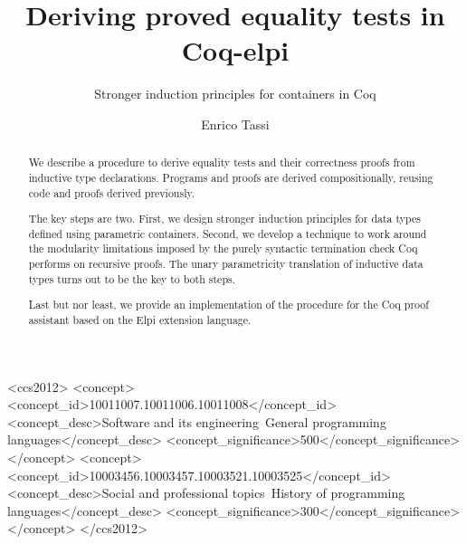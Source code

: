 \documentclass[sigplan,10pt,review]{acmart}\settopmatter{printfolios=true,printccs=false,printacmref=false}
\begin{document}
\title{Deriving proved equality tests in Coq-elpi}
\subtitle{Stronger induction principles for containers in Coq}

\author{Enrico Tassi}



\begin{abstract}
We describe a procedure to derive equality tests and their correctness
proofs from inductive type declarations.  Programs and proofs
are derived compositionally, reusing code and proofs derived
previously.  

The key steps are two. First, we
design stronger induction principles for data types defined
using parametric containers. Second, we
develop a technique to work around the modularity limitations
imposed by the purely syntactic termination check Coq performs
on recursive proofs. 
The unary parametricity translation of inductive data types
turns out to be the key to both steps.

Last but nor least, we provide an implementation of the procedure
for the Coq proof assistant based on the Elpi extension language.
\end{abstract}


\begin{CCSXML}
<ccs2012>
<concept>
<concept_id>10011007.10011006.10011008</concept_id>
<concept_desc>Software and its engineering~General programming languages</concept_desc>
<concept_significance>500</concept_significance>
</concept>
<concept>
<concept_id>10003456.10003457.10003521.10003525</concept_id>
<concept_desc>Social and professional topics~History of programming languages</concept_desc>
<concept_significance>300</concept_significance>
</concept>
</ccs2012>
\end{CCSXML}

\end{document}
